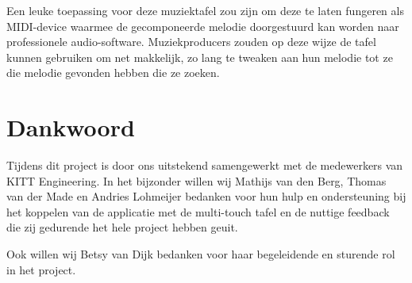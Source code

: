 \documentclass{acm}
\begin{document}
Een leuke toepassing voor deze muziektafel zou zijn om deze te laten fungeren als MIDI-device waarmee de gecomponeerde melodie doorgestuurd kan worden naar professionele audio-software. Muziekproducers zouden op deze wijze de tafel kunnen gebruiken om net makkelijk, zo lang te tweaken aan hun melodie tot ze die melodie gevonden hebben die ze zoeken.

\section{Dankwoord}
Tijdens dit project is door ons uitstekend samengewerkt met de medewerkers van KITT Engineering. In het bijzonder willen wij Mathijs van den Berg, Thomas van der Made en Andries Lohmeijer bedanken voor hun hulp en ondersteuning bij het koppelen van de applicatie met de multi-touch tafel en de nuttige feedback die zij gedurende het hele project hebben geuit.

Ook willen wij Betsy van Dijk bedanken voor haar begeleidende en sturende rol in het project.



\end{document}
